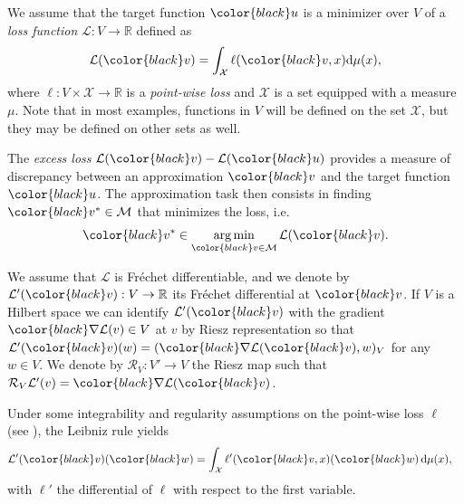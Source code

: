 \documentclass{article}
\theoremstyle{noparens}
\newcommand{\cL}{\mathcal{L}}
\newcommand{\cM}{\mathcal{M}}
\newcommand{\cX}{\mathcal{X}}
\newcommand{\R}{\mathbb{R}}
\newcommand{\dd}{\mathrm{d}}
\DeclareMathOperator*{\argmin}{arg\,min}
\newcommand{\colorV}{\color{black}}
\newcommand{\colorM}{\color{black}}
\renewcommand{\u}{{\colorV u}}
\newcommand{\w}{{\colorM w}}
\renewcommand{\v}{{\colorM v}}
\newcommand{\LossVGrad}{{\colorV \nabla \cL}}
\begin{document}
We assume that the target function $\u$ is a  minimizer over $V$ of a
\emph{loss function} $\cL: V\to \R$ defined as
$$\cL(\v)=\int_\cX \ell( \v , x) \dd \mu(x),$$
where $\ell:   V \times \cX \to \R$ is a \emph{point-wise loss} and
 $\cX$ is a set equipped with a measure $\mu$. Note that in most examples, functions in $V$ will be defined on the set $\cX$, but they may be defined on other sets as well.

The \emph{excess loss}  $\cL(\v) - \cL(\u) $ provides a measure of discrepancy between an  approximation $\v$ and the target function $\u$.
The approximation task then consists in  finding ${\colorM v^*} \in \cM$ that minimizes the loss, i.e.
\begin{equation}
    {\colorM v^*} \in \underset{\v\in \cM}{\argmin} \, \cL(\v). \label{min-loss}
\end{equation}

We assume that $\cL$ is Fréchet differentiable, and we denote by $\cL'(\v) : V \to \mathbb{R}$ its Fréchet differential at $\v$. If $V$ is a Hilbert space we can identify $\cL'(\v)$ with the gradient $\LossVGrad(v)\in V$ at $v$ by Riesz representation so that $\cL'(\v)(w) = (\LossVGrad(\v),w)_V$ for any $w\in V$. We denote by $\mathcal{R}_V :V'\to V$ the Riesz map such that $\mathcal{R}_V\cL'(v)=\LossVGrad(\v)$.

Under some integrability and regularity  assumptions  on    the  point-wise loss $\ell$  (see \cite{kammarfrechetdiff2016}), the Leibniz rule
yields
 \begin{align}
\cL'(\v)(\w) &= \int_\cX \ell'(\v, x)(\w) \,  \dd \mu(x) ,
\end{align}
with $\ell'$  the differential of $\ell$ with respect to the first variable.
\end{document}
